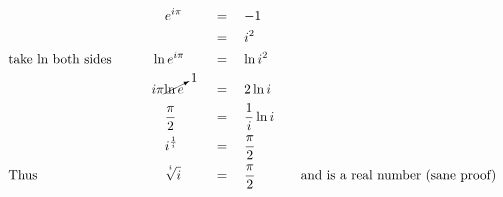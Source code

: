 \begin{alignat*}{5}
&\,&&\quad e^{i\pi}\quad&&\,=\quad-1\\
&\,&&\,&&\,=\quad i^2\\
&\mathrm{take~ln~both~sides}\qquad&&\ln{e^{i\pi}}\quad&&\,=\quad\ln{i^2}\\
&\,&&i\pi\cancelto{1}{\ln{e}}\quad&&\,=\quad2\ln{i}\\
&\,&&\quad\frac{\pi}{2}\quad&&\,=\quad\frac{{1}}{i}\ln{i}\\
&\,&&\quad i^\frac{1}{i}\quad&&\,=\quad\frac{\pi}{2}\\
&\mathrm{Thus}&&\quad\sqrt[^i]{i}&&\,=\quad\frac{\pi}{2}&&\quad\mathrm{and~is~a~real~number~(sane~proof)}
\end{alignat*}

